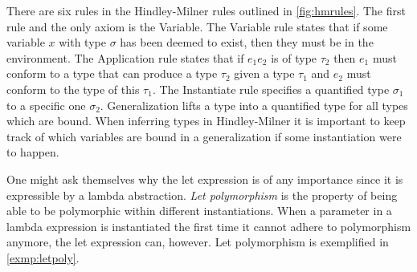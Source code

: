 \documentclass[11pt,oneside,a4paper]{report}
\begin{document}
There are six rules in the Hindley-Milner rules outlined in \autoref{fig:hmrules}.
The first rule and the only axiom is the Variable.
The Variable rule states that if some variable $x$ with type $\sigma$ has been deemed to exist, then they must be in the environment.
The Application rule states that if $e_1 e_2$ is of type $\tau_2$ then $e_1$ must conform to a type that can produce a type $\tau_2$ given a type $\tau_1$ and $e_2$ must conform to the type of this $\tau_1$.
The Instantiate rule specifies a quantified type $\sigma_1$ to a specific one $\sigma_2$.
Generalization lifts a type into a quantified type for all types which are bound.
When inferring types in Hindley-Milner it is important to keep track of which variables are bound in a generalization if some instantiation were to happen.

One might ask themselves why the let expression is of any importance since it is expressible by a lambda abstraction.
\textit{Let polymorphism} is the property of being able to be polymorphic within different instantiations.
When a parameter in a lambda expression is instantiated the first time it cannot adhere to polymorphism anymore, the let expression can, however.
Let polymorphism is exemplified in \autoref{exmp:letpoly}.
\end{document}
